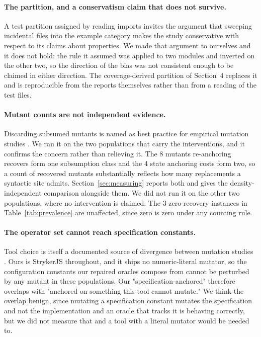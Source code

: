 \documentclass[12pt]{article}
\begin{document}
\paragraph{The partition, and a conservatism claim that does not survive.} A test
partition assigned by reading imports invites the argument that sweeping
incidental files into the example category makes the study conservative with
respect to its claims about properties. We made that argument to ourselves and it
does not hold: the rule it assumed was applied to two modules and inverted on the
other two, so the direction of the bias was not consistent enough to be claimed in
either direction. The coverage-derived partition of Section~4 replaces it and is
reproducible from the reports themselves rather than from a reading of the test
files.

\paragraph{Mutant counts are not independent evidence.} Discarding subsumed
mutants is named as best practice for empirical mutation studies
\cite{papadakis2019}. We ran it on the two populations that carry the
interventions, and it confirms the concern rather than relieving it. The 8 mutants
re-anchoring recovers form one subsumption class and the 4 state anchoring costs
form two, so a count of recovered mutants substantially reflects how many
replacements a syntactic site admits. Section~\ref{sec:measuring} reports both and
gives the density-independent comparison alongside them. We did not run it on the
other two populations, where no intervention is claimed. The 3 zero-recovery instances
in Table~\ref{tab:prevalence} are unaffected, since zero is zero under any
counting rule.

\paragraph{The operator set cannot reach specification constants.} Tool choice
is itself a documented source of divergence between mutation studies
\cite{papadakis2019}. Ours is StrykerJS throughout, and it
ships no numeric-literal mutator, so the configuration constants our repaired
oracles compose from cannot be perturbed by any mutant in these populations. Our "specification-anchored" therefore overlaps with "anchored on something this
tool cannot mutate." We think the overlap benign, since mutating a specification constant mutates the specification and not the implementation and an oracle that tracks it is behaving correctly, but we
did not measure that and a tool with a literal mutator would be needed to.
\end{document}
